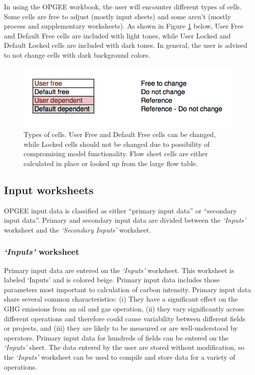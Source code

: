 \documentclass[11pt]{report}
\newcommand{\sheet}[1]{\textit{`{#1}'}}
\begin{document}
In using the OPGEE workbook, the user will encounter different types of cells. Some cells are free to adjust (mostly input sheets) and some aren't (mostly process and supplementary worksheets). As shown in Figure \ref{fig:cell_types} below, User Free and Default Free cells are included with light tones, while User Locked and Default Locked cells are included with dark tones. In general, the user is advised to not change cells with dark background colors.

\begin{figure}[ht]
\includegraphics[width=1\columnwidth]{images/Cell_Types.png}
\caption{Types of cells. User Free and Default Free cells can be changed, while Locked cells should not be changed due to possibility of compromising model functionality. Flow sheet cells are either calculated in place or looked up from the large flow table.}
\label{fig:cell_types}
\end{figure}

\subsection{Input worksheets} 

OPGEE input data is classified as either ``primary input data'' or ``secondary input data''. Primary and secondary input data are divided between the \sheet{Inputs} worksheet and the \sheet{Secondary Inputs} worksheet.

\subsubsection{\sheet{Inputs} worksheet}

Primary input data are entered on the \sheet{Inputs} worksheet. This worksheet is labeled `Inputs' and is colored beige. Primary input data includes those parameters most important to calculation of carbon intensity. Primary input data share several common characteristics: (i) They have a significant effect on the GHG emissions from an oil and gas operation, (ii) they vary significantly across different operations and therefore could cause variability between different fields or projects, and (iii) they are likely to be measured or are well-understood by operators. Primary input data for hundreds of fields can be entered on the \sheet{Inputs} sheet. The data entered by the user are stored without modification, so the \sheet{Inputs} worksheet can be used to compile and store data for a variety of operations.
\end{document}

